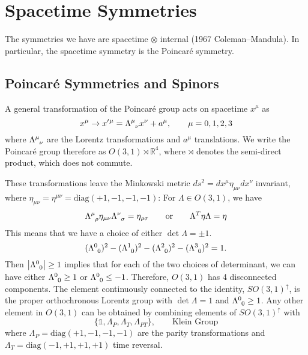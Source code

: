 
\chapter{Spacetime Symmetries}%
\label{cha:spacetime_symmetries}

The symmetries we have are spacetime $\otimes$  internal (1967 Coleman--Mandula). In particular, the spacetime symmetry is the Poincaré symmetry.

\section{Poincaré Symmetries and Spinors}%
\label{sec:poincare_symmetries_and_spinors}

A general transformation of the Poincaré group acts on spacetime $x^{\mu}$ as
\begin{equation}
  x^{\mu} \to x'{}^{\mu} = \Lambda\indices{^{\mu}_{\nu}} x^{\nu} + a^{\mu}, \qquad \mu = 0, 1, 2, 3
\end{equation}
where $\Lambda\indices{^{\mu}_{\nu}}$ are the Lorentz transformations and $a^{\mu}$ translations.
We write the Poincaré group therefore as $O(3, 1) \rtimes \mathbb{R}^4$, where $\rtimes$ denotes the semi-direct product, which does not commute.

These transformations leave the Minkowski metric $ds^2 = dx^{\mu} \eta_{\mu\nu} dx^{\nu}$ invariant, where $\eta_{\mu\nu} = \eta^{\mu\nu} = \text{diag}(+1, -1, -1, -1)$:
For $\Lambda \in O(3, 1)$, we have
\begin{equation}
  \label{eq:4-invariance}
  \Lambda\indices{^{\mu}_{\rho}} \eta_{\mu\nu} \Lambda\indices{^{\nu}_{\sigma}} = \eta_{\rho\sigma} \qquad \text{or} \qquad \Lambda^T \eta \Lambda = \eta
\end{equation}
This means that we have a choice of either $\det \Lambda = \pm 1$.
\begin{equation}
  (\Lambda\indices{^{0}_0})^2-(\Lambda\indices{^{1}_0})^2-(\Lambda\indices{^{2}_0})^2-(\Lambda\indices{^{3}_0})^2 = 1.
\end{equation}
Then $\abs{\Lambda \indices{^0_0}} \geq 1$ implies that for each of the two choices of determinant, we can have either $\Lambda \indices{^0_0} \geq 1$ or $\Lambda \indices{^0_0} \leq -1$.
Therefore, $O(3, 1)$ has 4 disconnected components. The element continuously connected to the identity, $SO(3, 1)^{\uparrow}$, is the proper orthochronous Lorentz group with $\det \Lambda = 1$ and $\Lambda \indices{^0_0} \geq 1$.
Any other element in $O(3,1)$ can be obtained by combining elements of $SO(3, 1)^{\uparrow}$ with
\begin{equation}
  \{\mathbb{1}, \Lambda_P, \Lambda_T, \Lambda_{PT}\}, \qquad \text{Klein Group}
\end{equation}
where $\Lambda_P = \text{diag}(+1, -1, -1, -1)$ are the parity transformations and $\Lambda_T = \text{diag}(-1, +1, +1, +1)$ time reversal.

